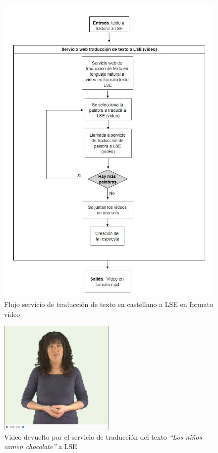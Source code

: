 \begin{figure}[]
	\centering
	\includegraphics[width=1\textwidth]{Imagenes/Fuentes/Text2LSE/FlujoVideoTexto.jpg}
	\caption{ Flujo servicio de traducción de texto en castellano a LSE en formato vídeo }
	\label {fig: imgFlujoVideoTextoText2LSE}
\end{figure}

\begin{figure}[]
	\centering
	\includegraphics[width=0.5\textwidth]{Imagenes/Fuentes/Text2LSE/videoOracion.jpg}
	\caption{Vídeo devuelto por el servicio de traducción del texto \textit{``Los niños comen chocolate''} a LSE}
	\label {fig: videoOracion}
\end{figure}

